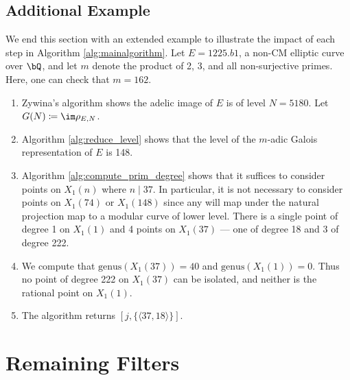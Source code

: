 \documentclass[11pt,reqno]{amsart}
\theoremstyle{plain}
\theoremstyle{definition}
\newcommand{\Q}{\bQ}
\begin{document}
\subsection{Additional Example}

We end this section with an extended example to illustrate the impact of each step in Algorithm \ref{alg:mainalgorithm}. Let $E=1225.b1$, a non-CM elliptic curve over $\Q$, and let $m$ denote the product of 2, 3, and all non-surjective primes. Here, one can check that $m=162$.
\begin{enumerate}
\item Zywina's algorithm shows the adelic image of $E$ is of level $N=5180$. Let $G(N) \coloneqq \im \rho_{E,N}$.
\item Algorithm \ref{alg:reduce_level} shows that the level of the $m$-adic Galois representation of $E$ is 148.
\item Algorithm \ref{alg:compute_prim_degree} shows that it suffices to consider points on $X_1(n)$ where $n \mid 37$. In particular, it is not necessary to consider points on $X_1(74)$ or $X_1(148)$ since any will map under the natural projection map to a modular curve of lower level. There is a single point of degree 1 on $X_1(1)$ and 4 points on $X_1(37)$ --- one of degree 18 and 3 of degree 222.
\item We compute that $\text{genus}(X_1(37))=40$ and  $\text{genus}(X_1(1))=0$. Thus no point of degree 222 on $X_1(37)$ can be isolated, and neither is the rational point on $X_1(1)$.
\item The algorithm returns $[j, \{\langle 37, 18 \rangle\}]$.
\end{enumerate}



\section{Remaining Filters}
\label{sec:remainingfilters}
\end{document}
